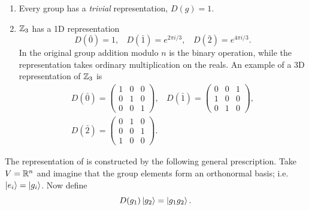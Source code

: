 \begin{example*}{}{}
\leavevmode
\begin{enumerate}
  \item Every group has a {\it trivial} 
    representation, $D(g)=1$.
  \item 
  $\mathbb{Z}_3$ has a 1D representation
  \begin{equation}
    D\left(\bar{0}\right)=1,~~~~
    D\left(\bar{1}\right)=e^{2\pi i/3},~~~~
    D\left(\bar{2}\right)=e^{4\pi i/3}.
  \end{equation}
  In the original group addition modulo $n$ is the binary operation,
  while the representation takes ordinary multiplication on the reals.
  An example of a 3D representation of $\mathbb{Z}_3$ is
  \begin{equation}\label{eq:reg}
  \begin{gathered}
    D\left(\bar{0}\right)=\left(\begin{array}{ccc}
                           1 & 0 & 0 \\
                           0 & 1 & 0 \\
                           0 & 0 & 1
                          \end{array}\right),~~~~
    D\left(\bar{1}\right)=\left(\begin{array}{ccc}
                           0 & 0 & 1 \\
                           1 & 0 & 0 \\
                           0 & 1 & 0
                          \end{array}\right),\\
    D\left(\bar{2}\right)=\left(\begin{array}{ccc}
                           0 & 1 & 0 \\
                           0 & 0 & 1 \\
                           1 & 0 & 0
                          \end{array}\right).
  \end{gathered}
  \end{equation}
  \end{enumerate}
\end{example*}
The representation of  is constructed by 
the following general prescription. Take $V=\mathbb{R}^n$ 
and imagine that the group elements form an orthonormal 
basis; i.e. $\ket{e_i}=\ket{g_i}$. Now define
\begin{equation}
  D(g_1)\ket{g_2}=\ket{g_1g_2}.
\end{equation}
